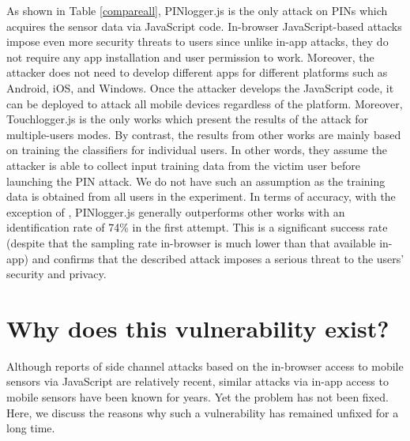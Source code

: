 \documentclass[10pt,twocolumn]{article}
\begin{document}
As shown in Table \ref{compareall}, PINlogger.js is the only attack on PINs which acquires the sensor data via JavaScript code. In-browser JavaScript-based attacks impose even more security threats to users since unlike in-app attacks, they do not require any app installation and user permission to work. Moreover, the attacker does not need to develop different apps for different platforms such as Android, iOS, and Windows. Once the attacker develops the JavaScript code, it can be deployed to attack all mobile devices regardless of the platform. 
Moreover, Touchlogger.js is the only works which present the results of the attack for multiple-users modes. By contrast, the results from other works are mainly based on training the classifiers for individual users. In other words, they assume the attacker is able to collect input training data from the victim user before launching the PIN attack. We do not have such an assumption as the training data is obtained from all users in the experiment.
In terms of accuracy, with the exception of \cite{KeyMic}, PINlogger.js generally outperforms other works with an identification rate of 74\% in the first attempt. 
This is a significant success rate (despite that the sampling rate in-browser is much lower than that available in-app) and confirms that the described attack imposes a serious threat to the users' security and privacy. 


\section{Why does this vulnerability exist?}
\label{Vul}
Although reports of side channel attacks based on the in-browser access to mobile sensors via JavaScript are relatively recent, similar attacks via in-app access to mobile sensors have been known for years. Yet the problem has not been fixed. 
Here, we discuss the reasons why such a vulnerability has remained unfixed for a long time. 
\end{document}

